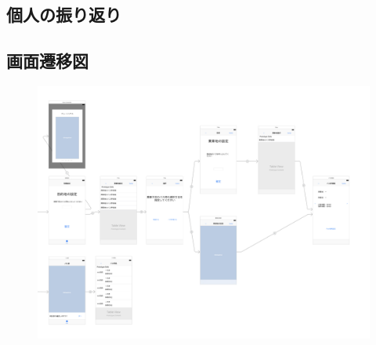 \documentclass[openany,11pt,papersize]{jsbook}
\begin{document}

\section{個人の振り返り}



  \begin{appendix}
  
\chapter{画面遷移図}
\begin{figure}[htbp]
  \begin{center}
    \includegraphics[clip,width=19cm,angle=90]{img/picture.png}
    \label{fig:senni}
  \end{center}
\end{figure}


\end{appendix}
\end{document}
